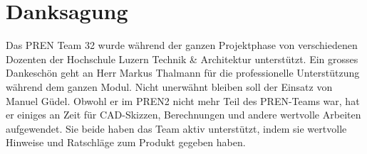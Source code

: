 \section{Danksagung}
Das PREN Team 32 wurde während der ganzen Projektphase von 
verschiedenen Dozenten der Hochschule Luzern Technik \& Architektur unterstützt. 
Ein grosses Dankeschön geht an Herr Markus Thalmann für die professionelle Unterstützung während dem
ganzen Modul.\newline
\newline
Nicht unerwähnt bleiben soll der Einsatz von Manuel Güdel. Obwohl er im PREN2 nicht mehr Teil des
PREN-Teams war, hat er einiges an Zeit für CAD-Skizzen, Berechnungen und andere wertvolle Arbeiten aufgewendet.
Sie beide haben das Team aktiv unterstützt, indem sie wertvolle Hinweise und Ratschläge zum Produkt gegeben haben.
